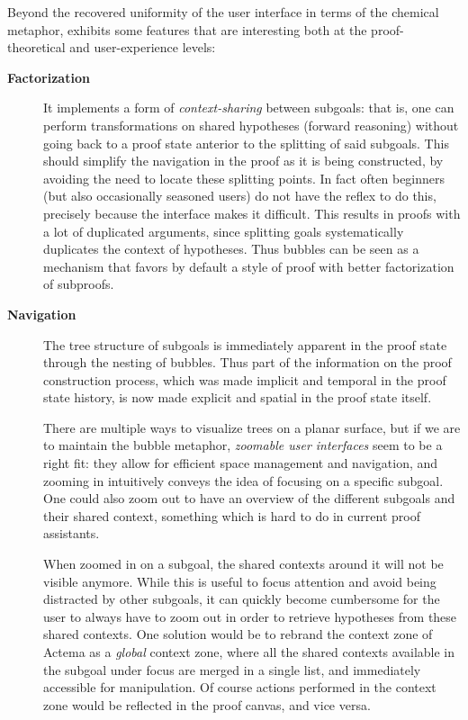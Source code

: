 Beyond the recovered uniformity of the user interface in terms of the chemical
metaphor,  exhibits some features that are interesting both at the
proof-theoretical and user-experience levels:
\begin{description}
  \item[\textbf{Factorization}] It implements a form of \emph{context-sharing}
    between subgoals: that is, one can perform transformations on shared
    hypotheses (forward reasoning) without going back to a proof state anterior
    to the splitting of said subgoals. This should simplify the navigation in
    the proof as it is being constructed, by avoiding the need to locate these
    splitting points. In fact often beginners (but also occasionally seasoned
    users) do not have the reflex to do this, precisely because the interface
    makes it difficult. This results in proofs with a lot of duplicated
    arguments, since splitting goals systematically duplicates the context of
    hypotheses. Thus bubbles can be seen as a mechanism that favors by default a
    style of proof with better factorization of
    subproofs.\label{par:factorization}

  \item[\textbf{Navigation}] The tree structure of subgoals is immediately
    apparent in the proof state through the nesting of bubbles. Thus part of the
    information on the proof construction process, which was made implicit and
    temporal in the proof state history, is now made explicit and spatial in the
    proof state itself.
    
    There are multiple ways to visualize trees on a planar surface, but if we
    are to maintain the bubble metaphor, \emph{zoomable user interfaces} seem to
    be a right fit: they allow for efficient space management and navigation,
    and zooming in intuitively conveys the idea of focusing on a specific
    subgoal. One could also zoom out to have an overview of the different
    subgoals and their shared context, something which is hard to do in current
    proof assistants.
    
    When zoomed in on a subgoal, the shared contexts around it will not be
    visible anymore. While this is useful to focus attention and avoid being
    distracted by other subgoals, it can quickly become cumbersome for the user
    to always have to zoom out in order to retrieve hypotheses from these shared
    contexts. One solution would be to rebrand the context zone of Actema as a
    \emph{global} context zone, where all the shared contexts available in the
    subgoal under focus are merged in a single list, and immediately accessible
    for manipulation. Of course actions performed in the context zone would be
    reflected in the proof canvas, and vice versa.


\end{description}
